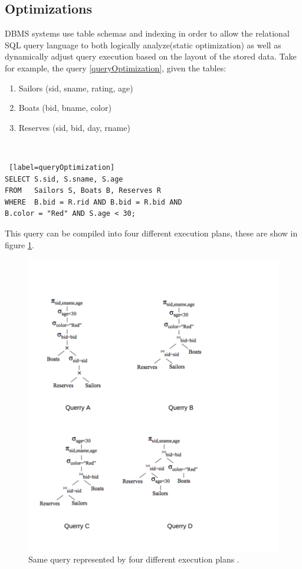 \documentclass[10pt,twocolumn]{IEEEtran11}
\begin{document}
\subsection{Optimizations}
DBMS systems use table schemas and indexing in order to allow the relational SQL query language to both logically analyze(static optimization) as well as dynamically adjust query execution based on the layout of the stored data. Take for example, the query \ref{queryOptimization}, given the tables:
\  \\
\begin{enumerate}
	\setlength\itemsep{1em}
	\item Sailors (sid, sname, rating, age)
	\item Boats (bid, bname, color)
	\item Reserves (sid, bid, day, rname)
\end{enumerate}
\  \\
\begin{lstlisting} [label=queryOptimization]
SELECT S.sid, S.sname, S.age
FROM   Sailors S, Boats B, Reserves R
WHERE  B.bid = R.rid AND B.bid = R.bid AND
B.color = "Red" AND S.age < 30;
\end{lstlisting}

This query can be compiled into four different execution plans, these are show in figure \ref{fig:queryExecutionPlan}.

\begin{figure}[h]
	\centering
	\includegraphics[scale=0.90]{images/logicalExecution.png}
	\caption{Same query represented by four different execution plans \protect\cite{LectureDB}. }
	\label{fig:queryExecutionPlan}
\end{figure}
\end{document}
